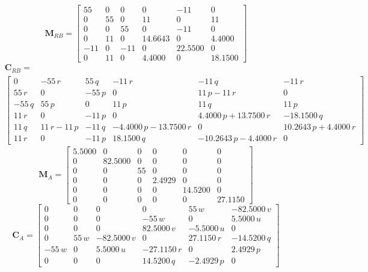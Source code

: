 \documentclass[12pt,a4]{article}
\begin{document}
\begin{equation*}
	\bm{M}_{RB} = \left[\begin{array}{cccccc} 55 & 0 & 0 & 0 & -11 & 0\\ 0 & 55 & 0 & 11 & 0 & 11\\ 0 & 0 & 55 & 0 & -11 & 0\\ 0 & 11 & 0 & 14.6643 & 0 & 4.4000\\ -11 & 0 & -11 & 0 & 22.5500 & 0\\ 0 & 11 & 0 & 4.4000 & 0 & 18.1500 \end{array}\right]
\end{equation*}
\begin{align*}
	 & \bm{C}_{RB} =                          \\
	 & \left[\begin{array}{cccccc} 0 & -55\,r & 55\,q & -11\,r & -11\,q & -11\,r\\ 55\,r & 0 & -55\,p & 0 & 11\,p-11\,r & 0\\ -55\,q & 55\,p & 0 & 11\,p & 11\,q & 11\,p\\ 11\,r & 0 & -11\,p & 0 & 4.4000\,p+13.7500\,r & -18.1500\,q\\ 11\,q & 11\,r-11\,p & -11\,q & -4.4000\,p-13.7500\,r & 0 & 10.2643\,p+4.4000\,r\\ 11\,r & 0 & -11\,p & 18.1500\,q & -10.2643\,p-4.4000\,r & 0 \end{array}\right]
\end{align*}
\begin{equation*}
	\bm{M}_A  = \left[\begin{array}{cccccc} 5.5000 & 0 & 0 & 0 & 0 & 0\\ 0 & 82.5000 & 0 & 0 & 0 & 0\\ 0 & 0 & 55 & 0 & 0 & 0\\ 0 & 0 & 0 & 2.4929 & 0 & 0\\ 0 & 0 & 0 & 0 & 14.5200 & 0\\ 0 & 0 & 0 & 0 & 0 & 27.1150 \end{array}\right]
\end{equation*}
\begin{equation*}
	\bm{C}_A  = \left[\begin{array}{cccccc} 0 & 0 & 0 & 0 & 55\,w & -82.5000\,v\\ 0 & 0 & 0 & -55\,w & 0 & 5.5000\,u\\ 0 & 0 & 0 & 82.5000\,v & -5.5000\,u & 0\\ 0 & 55\,w & -82.5000\,v & 0 & 27.1150\,r & -14.5200\,q\\ -55\,w & 0 & 5.5000\,u & -27.1150\,r & 0 & 2.4929\,p\\ 0 & 0 & 0 & 14.5200\,q & -2.4929\,p & 0 \end{array}\right]
\end{equation*}
\end{document}
